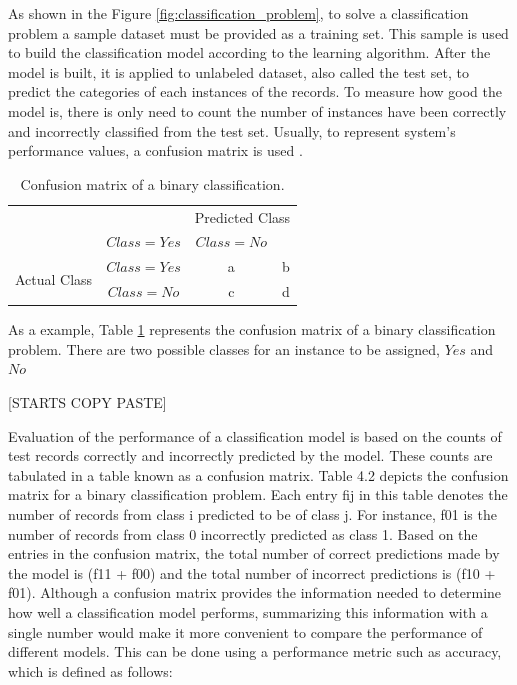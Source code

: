 As shown in the Figure \ref{fig:classification_problem}, to solve a classification problem a sample dataset must be provided as a training set. This sample is used to build the classification model according to the learning algorithm. After the model is built, it is applied to unlabeled dataset, also called the test set, to predict the categories of each instances of the records. To measure how good the model is, there is only need to count the number of instances have been correctly and incorrectly classified from the test set. Usually, to represent system's performance values, a confusion matrix is used \cite{hamilton2000confusion}. 


\begin{table}[!htp]
\centering
\begin{tabular}{ |c|c|c|c| }
\hline
\multicolumn{2}{|c|}{} & \multicolumn{2}{c|}{Predicted Class} \\
\hhline{~~--}
\multicolumn{2}{|c|}{} & $Class = Yes$ & $Class = No$ \\ \hline
\multirow{2}{*}{Actual Class} & $Class = Yes$ & a & b \\
\hhline{~---}
& $Class = No$ & c & d \\
\hline
\end{tabular}
\caption{Confusion matrix of a binary classification.}
\label{tab:confusion_matrix}
\end{table}

As a example, Table \ref{tab:confusion_matrix} represents the confusion matrix of a binary classification problem. 
\iffalse
There are two possible classes for an instance to be assigned, $Yes$ and $No$

[STARTS COPY PASTE]

Evaluation of the performance of a classification model is based on the counts of test records correctly and incorrectly predicted by the model. These counts are tabulated in a table known as a confusion matrix. Table 4.2 depicts the confusion matrix for a binary classification problem. Each entry fij in this table denotes the number of records from class i predicted to be of class j. For instance, f01 is the number of records from class 0 incorrectly predicted as class 1. Based on the entries in the confusion matrix, the total number of correct predictions made by the model is (f11 + f00) and the total number of incorrect predictions is (f10 + f01).
Although a confusion matrix provides the information needed to determine how well a classification model performs, summarizing this information with a single number would make it more convenient to compare the performance of different models. This can be done using a performance metric such as accuracy, which is defined as follows:

